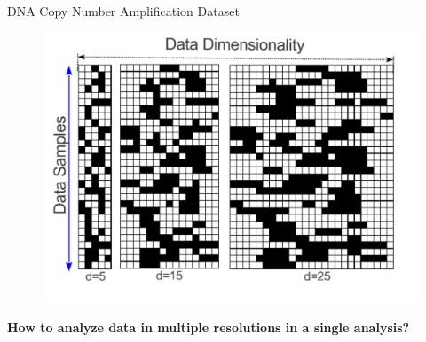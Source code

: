 \documentclass[first=dgreen,second=purple,logo=redexc]{aaltoslides}
\begin{document}




\begin{frame}{DNA Copy Number Amplification Dataset}
\begin{figure}[h!]
  \centering
  \includegraphics[height=0.8\textheight]{figures/datavis}
   \label{Fig:converge}
\end{figure}

\vspace{-6.5mm}

\textbf{{\color{red}How to analyze data in multiple resolutions in a single analysis?}}
\end {frame}
\end{document}
